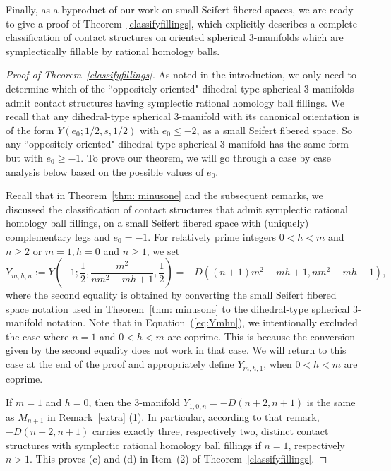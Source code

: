 \documentclass[11pt]{amsart}
\theoremstyle{plain}
\theoremstyle{definition}
\theoremstyle{remark}
\numberwithin{theorem}{section}
\begin{document}
Finally, as a byproduct of our work on small Seifert fibered spaces, we are ready to give a proof of Theorem~\ref{classifyfillings}, which explicitly describes a complete classification of contact structures on oriented spherical $3$-manifolds which are symplectically fillable by rational homology balls.

\begin{proof}[Proof of Theorem~\ref{classifyfillings}]
As noted in the introduction, we only need to determine which of the ``oppositely oriented" dihedral-type spherical $3$-manifolds admit contact structures having symplectic rational homology ball fillings. We recall that any dihedral-type spherical $3$-manifold with its canonical orientation  is of the form $Y(e_0;1/2, s,1/2)$ with $e_0\leq -2$, as a small Seifert fibered space. So any ``oppositely oriented" dihedral-type spherical $3$-manifold has the same form but with $e_0\geq -1$.  To prove our theorem, we will go through a case by case analysis below based on the possible values of $e_0$.


Recall that in Theorem~\ref{thm: minusone} and the subsequent remarks, we discussed the classification of contact structures that admit symplectic rational homology ball fillings, on a small Seifert fibered space with (uniquely) complementary legs and $e_0=-1$. For relatively prime integers $0<h<m$ and $n\geq 2$ or $m=1, h=0$ and $n\geq 1$, we set 
\begin{equation}\label{eq:Ymhn}
Y_{m,h,n}:=Y\left(-1;\dfrac{1}{2}, \dfrac{m^2}{nm^2-mh+1}, \dfrac{1}{2}\right)=-D((n+1)m^2-mh+1, nm^2-mh+1),
\end{equation} 
where the second equality is obtained by converting the small Seifert fibered space notation used in Theorem~\ref{thm: minusone}  to the dihedral-type spherical $3$-manifold notation.  Note that in Equation~(\ref{eq:Ymhn}), we intentionally excluded the case where $n=1$ and $0 < h < m$ are coprime. This is because the conversion given by the second equality does not work in that case. We will return to this case at the end of the proof and appropriately define $Y_{m,h,1}$, when $0 < h < m$ are coprime.

If $m= 1$ and  $h=0$, then the $3$-manifold $Y_{1,0,n}=-D(n+2, n+1)$ is the same as $M_{n+1}$ in Remark~\ref{extra} (1). In particular, according to that remark, $-D(n+2, n+1)$ carries exactly three, respectively two, distinct contact structures with symplectic rational homology ball fillings if $n=1$, respectively $n>1$. This proves  (c) and (d) in Item~(2) of Theorem~\ref{classifyfillings}. 


\end{proof}
\end{document}
